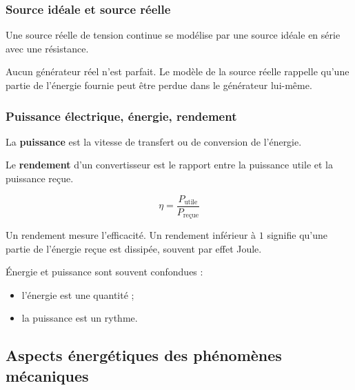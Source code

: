 \documentclass[11pt,a4paper]{article}
\begin{document}
\subsubsection{Source idéale et source réelle}

\begin{definitionbox}
Une source réelle de tension continue se modélise par une source idéale en série avec une résistance.
\end{definitionbox}

\begin{sensbox}
Aucun générateur réel n'est parfait.  
Le modèle de la source réelle rappelle qu'une partie de l'énergie fournie peut être perdue dans le générateur lui-même.
\end{sensbox}

\subsubsection{Puissance électrique, énergie, rendement}

\begin{definitionbox}
La \textbf{puissance} est la vitesse de transfert ou de conversion de l'énergie.
\end{definitionbox}

\begin{definitionbox}
Le \textbf{rendement} d'un convertisseur est le rapport entre la puissance utile et la puissance reçue.
\end{definitionbox}

\[
\eta=\frac{P_{\text{utile}}}{P_{\text{reçue}}}
\]

\begin{sensbox}
Un rendement mesure l'efficacité.  
Un rendement inférieur à \(1\) signifie qu'une partie de l'énergie reçue est dissipée, souvent par effet Joule.
\end{sensbox}

\begin{attentionbox}
Énergie et puissance sont souvent confondues :
\begin{itemize}
    \item l'énergie est une quantité ;
    \item la puissance est un rythme.
\end{itemize}
\end{attentionbox}

\subsection{Aspects énergétiques des phénomènes mécaniques}
\end{document}
